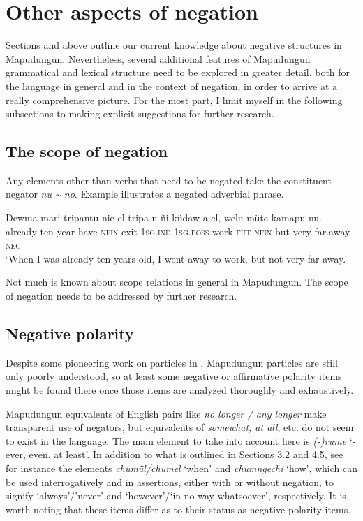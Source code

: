 \documentclass[output=paper,colorlinks,citecolor=brown,draft]{langscibook}
\begin{document}
\section{Other aspects of negation}
\label{sec:mapu:4}

Sections  and  above outline our current knowledge about negative structures in Mapudungun. Nevertheless, several additional features of Mapudungun grammatical and lexical structure need to be explored in greater detail, both for the language in general and in the context of negation, in order to arrive at a really comprehensive picture. For the most part, I limit myself in the following subsections to making explicit suggestions for further research.

\subsection{The scope of negation}

Any elements other than verbs that need to be negated take the constituent negator \textit{nu {\textasciitilde} no}. Example  illustrates a negated adverbial phrase.

\ea\label{ex:mapu:25}
    \gll Dewma  mari  tripantu  nie-el    tripa-n ñi    küdaw-a-el,    welu  müte kamapu  nu.\\ 
         already  ten  year    have-\textsc{nfin} exit-\textsc{1sg.ind} \textsc{1sg.poss} work-\textsc{fut-nfin} but  very far.away  \textsc{neg}\\
    \glt ‘When I was already ten years old, I went away to work, but not very far away.’ \citep[245]{Smeets2008}
\z 
 
Not much is known about scope relations in general in Mapudungun. The scope of negation needs to be addressed by further research.

\subsection{Negative polarity}
Despite some pioneering work on particles in \citet[Ch.32]{Smeets2008}, Mapudungun particles are still only poorly understood, so at least some negative or affirmative polarity items might be found there once those items are analyzed thoroughly and exhaustively.  

Mapudungun equivalents of English pairs like \textit{no longer / any longer} make transparent use of negators, but equivalents of \textit{somewhat, at all}, etc. do not seem to exist in the language. The main element to take into account here is \textit{(-)rume} ‘\nobreakdash-ever, even, at least’. In addition to what is outlined in Sections 3.2 and 4.5, see for instance the elements \textit{chumül/chumel} ‘when’ and \textit{chumngechi} ‘how’, which can be used interrogatively and in assertions, either with or without negation, to signify ‘always’/’never’ and ‘however’/‘in no way whatsoever’, respectively. It is worth noting that these items differ as to their status as negative polarity items.
\end{document}
